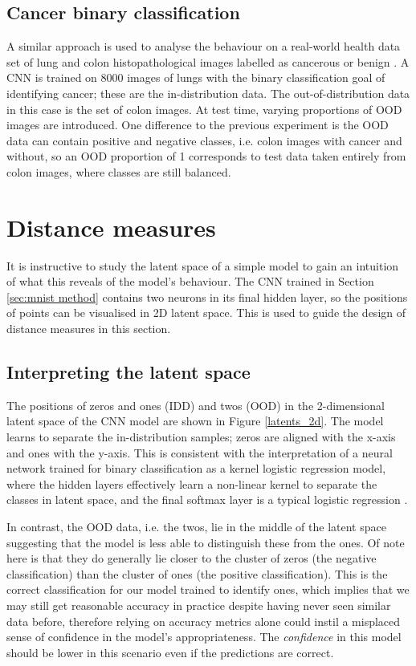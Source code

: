 \documentclass{article}
\begin{document}
\subsection{Cancer binary classification}
\label{sec:cancer method}
A similar approach is used to analyse the behaviour on a real-world health data set of lung and colon histopathological images labelled as cancerous or benign \cite{borkowski_lung_colon}. A CNN is trained on 8000 images of lungs with the binary classification goal of identifying cancer; these are the in-distribution data. The out-of-distribution data in this case is the set of colon images. At test time, varying proportions of OOD images are introduced. One difference to the previous experiment is the OOD data can contain positive and negative classes, i.e. colon images with cancer and without, so an OOD proportion of 1 corresponds to test data taken entirely from colon images, where classes are still balanced.




\section{Distance measures}
\label{sec:distance measures}
It is instructive to study the latent space of a simple model to gain an intuition of what this reveals of the model's behaviour. The CNN trained in Section \ref{sec:mnist method} contains two neurons in its final hidden layer, so the positions of points can be visualised in 2D latent space. This is used to guide the design of distance measures in this section.

\subsection{Interpreting the latent space}
\label{sec:interpret latent space}

The positions of zeros and ones (IDD) and twos (OOD) in the 2-dimensional latent space of the CNN model are shown in Figure \ref{latents_2d}. The model learns to separate the in-distribution samples; zeros are aligned with the x-axis and ones with the y-axis. This is consistent with the interpretation of a  neural network trained for binary classification as a kernel logistic regression model, where the hidden layers effectively learn a non-linear kernel to separate the classes in latent space, and the final softmax layer is a typical logistic regression \cite{pmlr-v202-guyomard23a}.

In contrast, the OOD data, i.e. the twos, lie in the middle of the latent space suggesting that the model is less able to distinguish these from the ones. Of note here is that they do generally lie closer to the cluster of zeros (the negative classification) than the cluster of ones (the positive classification). This is the correct classification for our model trained to identify ones, which implies that we may still get reasonable accuracy in practice despite having never seen similar data before, therefore relying on accuracy metrics alone could instil a misplaced sense of confidence in the model's appropriateness. The \emph{confidence} in this model should be lower in this scenario even if the predictions are correct.
\end{document}
